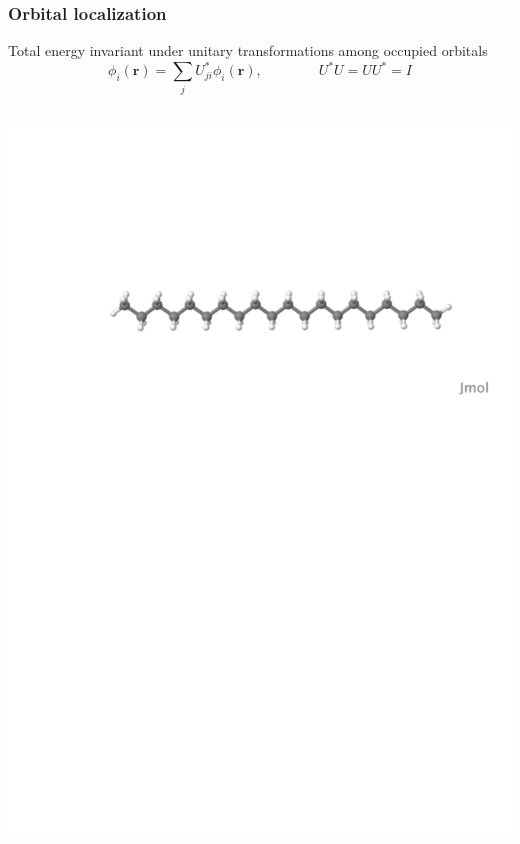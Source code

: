 \documentclass[mathserif, 10pt]{beamer}
\begin{document}
\begin{frame}
    \frametitle{Orbital localization}
    \centering
    Total energy invariant under unitary transformations among occupied orbitals
    \begin{equation}
	\nonumber
	\phi_i(\boldsymbol{r}) = \sum_j U_{ji}^\ast \phi_i(\boldsymbol{r}), \qquad \qquad U^\ast U = UU^\ast = I
    \end{equation}

    \begin{columns}
    \begin{column}[b]{0.48\linewidth}
    \centering
    \includegraphics[scale=0.25, clip, viewport = 80 560 600 700]{figures/alkane.pdf}\\

\end{column}
\end{columns}
\end{frame}
\end{document}
